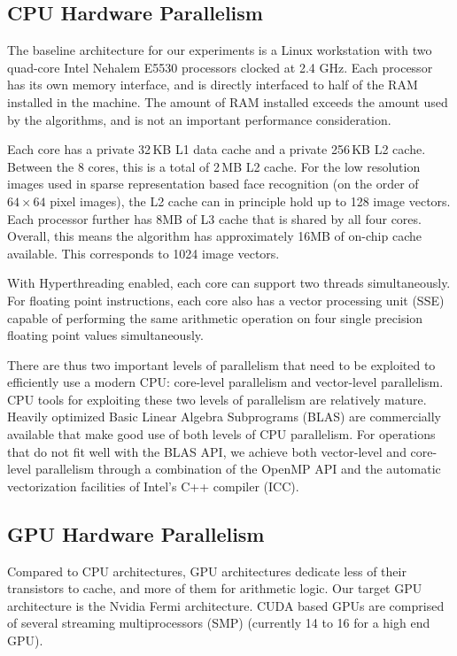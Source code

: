 \documentclass[10pt,twocolumn,letterpaper]{article}
\begin{document}
\subsection{CPU Hardware Parallelism} 
The baseline architecture for our experiments is a Linux workstation with two
quad-core Intel Nehalem E5530 processors clocked at 2.4 GHz.  Each processor
has its own memory interface, and is directly interfaced to half of the RAM
installed in the machine.  The amount of RAM installed exceeds the amount used
by the algorithms, and is not an important performance consideration.  

Each core has a private 32\,KB L1 data cache and a private 256\,KB L2 cache.  
Between the 8 cores, this is a total of 2\,MB L2 cache.
For the low resolution images used in sparse representation based
face recognition (on the order of $64\times64$ pixel images), the L2 cache
can in principle hold up to 128 image vectors.
Each processor further has 8MB of L3 cache that is shared by all four cores.
Overall, this means the algorithm has approximately 16MB of on-chip cache
available.  This corresponds to 1024 image vectors.  

With Hyperthreading enabled, each core can support two threads simultaneously.
For floating point instructions, each core also has a vector processing unit
(SSE) capable of performing the same arithmetic operation on four single
precision floating point values simultaneously.  

There are thus two important levels of parallelism that need to be exploited to
efficiently use a modern CPU: core-level parallelism and vector-level
parallelism. CPU tools for exploiting these two levels of parallelism are
relatively mature.  Heavily optimized Basic Linear Algebra Subprograms (BLAS) are
commercially available that make good use of both levels of CPU parallelism.
For operations that do not fit well with the BLAS API, we 
achieve both vector-level and core-level parallelism through a combination of
the OpenMP API \cite{dagum2002openmp} and the automatic vectorization 
facilities of Intel's C++ compiler (ICC)\cite{dulong1999overview}.
\subsection{GPU Hardware Parallelism}
Compared to CPU architectures, GPU architectures dedicate less of their transistors
to cache, and more of them for arithmetic logic. Our target GPU architecture
is the Nvidia Fermi architecture.  CUDA based GPUs are comprised of several 
streaming multiprocessors (SMP) (currently 14 to 16 for a high end GPU).
\end{document}
